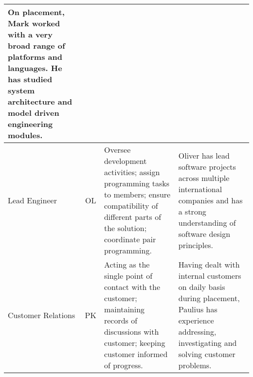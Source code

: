 \begin{table*}[h!]
\begin{tabularx}{\textwidth}{|p{2cm}|c|Y|Y|}
        On placement, Mark worked with a very broad range of platforms and languages. He has studied system architecture and model driven engineering modules.\\
        \hline
        Lead Engineer & 
        OL & 
        Oversee development activities; assign programming tasks to members; ensure compatibility of different parts of the solution; coordinate pair programming. & 
        Oliver has lead software projects across multiple international companies and has a strong understanding of software design principles.\\
        \hline
        Customer Relations & 
        PK & 
        Acting as the single point of contact with the customer; maintaining records of discussions with customer; keeping customer informed of progress. & 
        Having dealt with internal customers on daily basis during placement, Paulius has experience addressing, investigating and solving customer problems. \\
        \hline
        \end{tabularx}
    \end{table*}